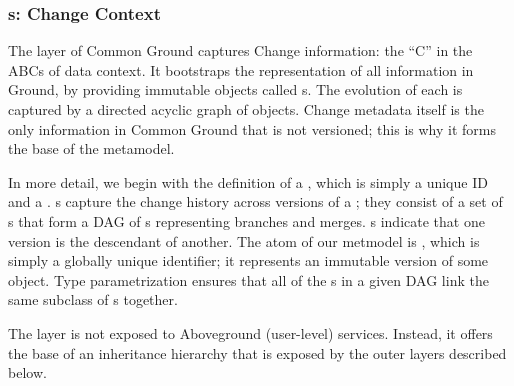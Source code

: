 \documentclass{sig-alternate}
\begin{document}

\subsubsection{{\Core}s: Change Context}

The \core layer of Common Ground captures Change information: the ``C'' in the ABCs of data context. It
bootstraps the representation of all information in Ground, by providing immutable objects called {\thing}s. The evolution of each \thing is captured by a directed acyclic graph of {\version} objects. Change metadata itself is the only information in Common Ground that is not versioned; this is why it forms the base of the metamodel.


In more detail, we begin with the definition of a \thing, which is simply a unique ID and a . 
s capture the change history across versions of a \thing; they consist of a set of s that form a DAG of {\version}s representing branches and merges.
s indicate that one version is the descendant of another.
The atom of our metmodel is \version, which is simply a globally unique identifier; it represents an immutable version of some object. 
Type parametrization ensures that all of the s in a given DAG link the same subclass of {\version}s together.

The \core layer is not exposed to Aboveground (user-level) services. 
Instead, it offers the base of an inheritance hierarchy that is exposed by the outer layers described below.

\end{document}

